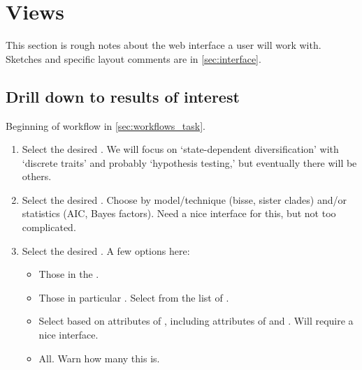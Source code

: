 \section{Views}
\label{sec:views}

This section is rough notes about the web interface a user will work with.
Sketches and specific layout comments are in \cref{sec:interface}.

\subsection{Drill down to results of interest}
\label{sec:views_task}

Beginning of workflow in \cref{sec:workflows_task}.

\begin{enumerate}

    \item Select the desired \Task.
          We will focus on `state-dependent diversification' with `discrete traits' and probably `hypothesis testing,' but eventually there will be others.

    \item Select the desired \Methods.
          Choose by model/technique (\eg bisse, sister clades) and/or statistics (\eg AIC, Bayes factors).
          Need a nice interface for this, but not too complicated.

    \item Select the desired \Elements.  A few options here:
        \begin{itemize}
            \item Those in the \Benchmark.
            \item Those in particular \Refsets.  Select from the list of \Refsets.
            \item Select based on attributes of \Elements, including attributes of \Trees and \Traits.  Will require a nice interface. %
            \item All.  Warn how many this is.
        \end{itemize}
\end{enumerate}

